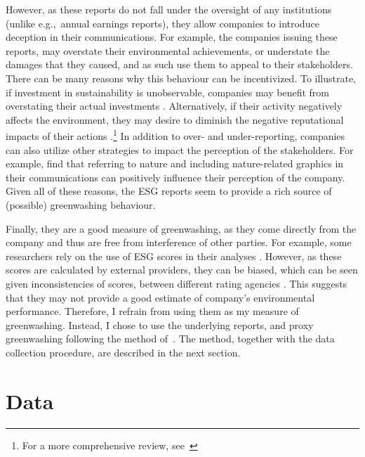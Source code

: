 \documentclass[12pt]{article}
\begin{document}
However, as these reports do not fall under the oversight of any institutions (unlike e.g.,~annual earnings reports), they allow companies to introduce deception in their communications. For example, the companies issuing these reports, may overstate their environmental achievements, or understate the damages that they caused, and as such use them to appeal to their stakeholders. There can be many reasons why this behaviour can be incentivized. To illustrate, if investment in sustainability is unobservable, companies may benefit from overstating their actual investments \parencite{wuBadGreenwashingGood2020}. Alternatively, if their activity negatively affects the environment, they may desire to diminish the negative reputational impacts of their actions \parencite{marquisScrutinyNormsSelective2016, binglerCheapTalkCherrypicking2022}.\footnote{For a more comprehensive review, see~\cite{kimGreenwashVsBrownwash2015}} In addition to over- and under-reporting, companies can also utilize other strategies to impact the perception of the stakeholders. For example, \textcite{parguelCanEvokingNature2015,schmuckMisleadingConsumersGreen2018} find that referring to nature and including nature-related graphics in their communications can positively influence their perception of the company. Given all of these reasons, the ESG reports seem to provide a rich source of (possible) greenwashing behaviour.


Finally, they are a good measure of greenwashing, as they come directly from the company and thus are free from interference of other parties. For example, some researchers rely on the use of ESG scores in their analyses \parencite{servaesImpactCorporateSocial2013, flammerDoesCorporateSocial2015, linsSocialCapitalTrust2017}. However, as these scores are calculated by external providers, they can be biased, which can be seen given inconsistencies of scores, between different rating agencies \parencite{bergAggregateConfusionDivergence2022, chatterjiRatingsFirmsConverge2016}. This suggests that they may not provide a good estimate of company's environmental performance. Therefore, I refrain from using them as my measure of greenwashing. Instead, I chose to use the underlying reports, and proxy greenwashing following the method of~\textcite{binglerHowCheapTalk2024}. The method, together with the data collection procedure, are described in the next section.


\section{Data}\label{sect:data}
\end{document}
